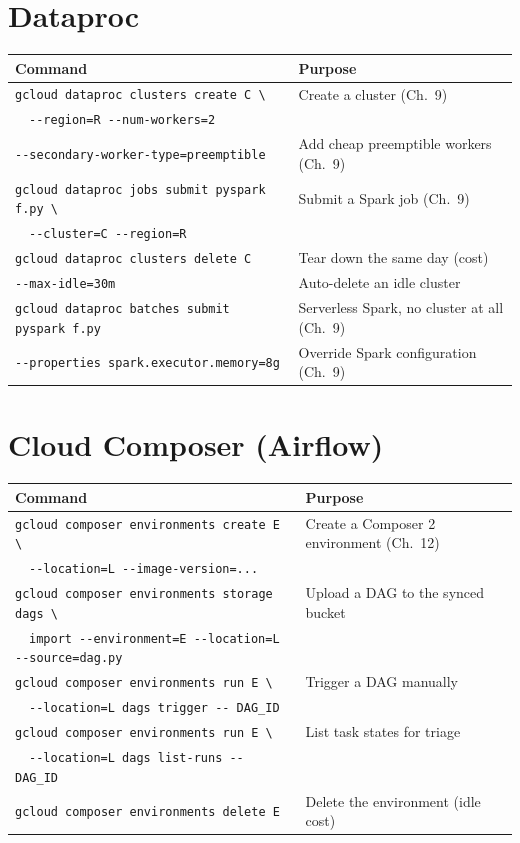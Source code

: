 \section{Dataproc}
\begin{center}
\footnotesize
\begin{tabular}{@{}p{6.6cm}p{6.2cm}@{}}
\toprule
\textbf{Command} & \textbf{Purpose} \\
\midrule
\texttt{gcloud dataproc clusters create C \textbackslash} & Create a cluster (Ch.~9) \\
~~\texttt{-{}-region=R -{}-num-workers=2} & \\
\texttt{-{}-secondary-worker-type=preemptible} & Add cheap preemptible workers (Ch.~9) \\
\texttt{gcloud dataproc jobs submit pyspark f.py \textbackslash} & Submit a Spark job (Ch.~9) \\
~~\texttt{-{}-cluster=C -{}-region=R} & \\
\texttt{gcloud dataproc clusters delete C} & Tear down the same day (cost) \\
\texttt{-{}-max-idle=30m} & Auto-delete an idle cluster \\
\texttt{gcloud dataproc batches submit pyspark f.py} & Serverless Spark, no cluster at all (Ch.~9) \\
\texttt{-{}-properties spark.executor.memory=8g} & Override Spark configuration (Ch.~9) \\
\bottomrule
\end{tabular}
\end{center}

\section{Cloud Composer (Airflow)}
\begin{center}
\footnotesize
\begin{tabular}{@{}p{6.6cm}p{6.2cm}@{}}
\toprule
\textbf{Command} & \textbf{Purpose} \\
\midrule
\texttt{gcloud composer environments create E \textbackslash} & Create a Composer 2 environment (Ch.~12) \\
~~\texttt{-{}-location=L -{}-image-version=...} & \\
\texttt{gcloud composer environments storage dags \textbackslash} & Upload a DAG to the synced bucket \\
~~\texttt{import -{}-environment=E -{}-location=L -{}-source=dag.py} & \\
\texttt{gcloud composer environments run E \textbackslash} & Trigger a DAG manually \\
~~\texttt{-{}-location=L dags trigger -{}- DAG\_ID} & \\
\texttt{gcloud composer environments run E \textbackslash} & List task states for triage \\
~~\texttt{-{}-location=L dags list-runs -{}- DAG\_ID} & \\
\texttt{gcloud composer environments delete E} & Delete the environment (idle cost) \\
\bottomrule
\end{tabular}
\end{center}

